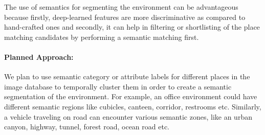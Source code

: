 \documentclass{article}
\begin{document}
% 

The use of semantics for segmenting the environment can be advantageous because firstly, deep-learned features are more discriminative \cite{chen2017deep} as compared to hand-crafted ones and secondly, it can help in filtering or shortlisting of the place matching candidates by performing a semantic matching first.

\paragraph{Planned Approach:}
We plan to use semantic category or attribute labels for different places in the image database to temporally cluster them in order to create a semantic segmentation of the environment. For example, an office environment could have different semantic regions like cubicles, canteen, corridor, restrooms etc. Similarly, a vehicle traveling on road can encounter various semantic zones, like an urban canyon, highway, tunnel, forest road, ocean road etc.
\end{document}
